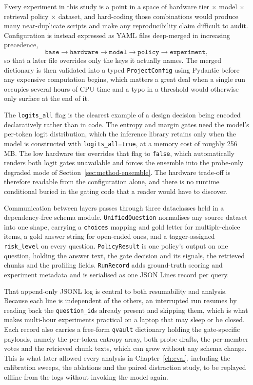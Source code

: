 Every experiment in this study is a point in a space of hardware tier
$\times$ model $\times$ retrieval policy $\times$ dataset, and hard-coding
those combinations would produce many near-duplicate scripts and make any
reproducibility claim difficult to audit. Configuration is instead expressed
as YAML files deep-merged in increasing precedence,
\[
  \texttt{base} \rightarrow \texttt{hardware} \rightarrow \texttt{model}
  \rightarrow \texttt{policy} \rightarrow \texttt{experiment},
\]
so that a later file overrides only the keys it actually names. The merged
dictionary is then validated into a typed \texttt{ProjectConfig} using
Pydantic before any expensive computation begins, which matters a great deal
when a single run occupies several hours of CPU time and a typo in a
threshold would otherwise only surface at the end of it.

The \texttt{logits\_all} flag is the clearest example of a design decision
being encoded declaratively rather than in code. The entropy and margin gates
need the model's per-token logit distribution, which the inference library
retains only when the model is constructed with \texttt{logits\_all=true}, at
a memory cost of roughly 256\,MB. The low hardware tier overrides that flag to
\texttt{false}, which automatically renders both logit gates unavailable and
forces the ensemble into the probe-only degraded mode of
Section~\ref{sec:method-ensemble}. The hardware trade-off is therefore
readable from the configuration alone, and there is no runtime conditional
buried in the gating code that a reader would have to discover.

Communication between layers passes through three dataclasses held in a
dependency-free schema module. \texttt{UnifiedQuestion} normalises any source
dataset into one shape, carrying a \texttt{choices} mapping and gold letter
for multiple-choice items, a gold answer string for open-ended ones, and a
tagger-assigned \texttt{risk\_level} on every question.
\texttt{PolicyResult} is one policy's output on one question, holding the
answer text, the gate decision and its signals, the retrieved chunks and the
profiling fields. \texttt{RunRecord} adds ground-truth scoring and experiment
metadata and is serialised as one JSON Lines record per query.

That append-only JSONL log is central to both resumability and analysis.
Because each line is independent of the others, an interrupted run resumes by
reading back the \texttt{question\_id}s already present and skipping them,
which is what makes multi-hour experiments practical on a laptop that may
sleep or be closed. Each record also carries a free-form \texttt{qvault}
dictionary holding the gate-specific payloads, namely the per-token entropy
array, both probe drafts, the per-member votes and the retrieved chunk texts,
which can grow without any schema change. This is what later allowed every
analysis in Chapter~\ref{ch:eval}, including the calibration sweeps, the
ablations and the paired distraction study, to be replayed offline from the
logs without invoking the model again.

